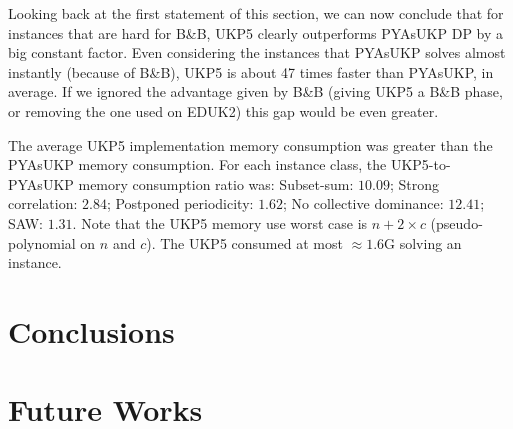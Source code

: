 \documentclass[runningheads,a4paper]{llncs}
\begin{document}
Looking back at the first statement of this section, we can now conclude that for instances that are hard for B\&B, UKP5 clearly outperforms PYAsUKP DP by a big constant factor. Even considering the instances that PYAsUKP solves almost instantly (because of B\&B), UKP5 is about 47 times faster than PYAsUKP, in average. If we ignored the advantage given by B\&B (giving UKP5 a B\&B phase, or removing the one used on EDUK2) this gap would be even greater.

The average UKP5 implementation memory consumption was greater than the PYAsUKP memory consumption. For each instance class, the UKP5-to-PYAsUKP memory consumption ratio was: Subset-sum: \(10.09\); Strong correlation: \(2.84\); Postponed periodicity: \(1.62\); No collective dominance: \(12.41\); SAW: \(1.31\). Note that the UKP5 memory use worst case is \(n + 2\times c\) (pseudo-polynomial on \(n\) and \(c\)). The UKP5 consumed at most \(\approx 1.6\)G solving an instance.

\section{Conclusions}

\section{Future Works}
\end{document}
